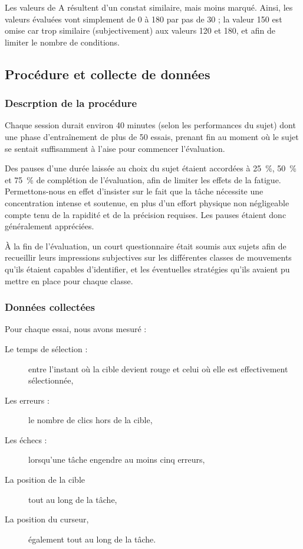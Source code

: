 	Les valeurs de A résultent d'un constat similaire, mais moins marqué. Ainsi, les valeurs évaluées vont simplement de 0\textdegree{} à 180\textdegree{} par pas de 30\textdegree{} ; la valeur 150\textdegree{} est omise car trop similaire (subjectivement) aux valeurs 120\textdegree{} et 180\textdegree{}, et afin de limiter le nombre de conditions.

	\subsection{Procédure et collecte de données}
	\subsubsection{Descrption de la procédure}
	Chaque session durait environ 40 minutes (selon les performances du sujet) dont une phase d'entraînement de plus de 50 essais, prenant fin au moment où le sujet se sentait suffisamment à l'aise pour commencer l'évaluation.
	
	Des pauses d'une durée laissée au choix du sujet étaient accordées à 25~\%{}, 50~\%{} et 75~\%{} de complétion de l'évaluation, afin de limiter les effets de la fatigue. Permettons-nous en effet d'insister sur le fait que la tâche nécessite une concentration intense et soutenue, en plus d'un effort physique non négligeable compte tenu de la rapidité et de la précision requises. Les pauses étaient donc généralement appréciées.
	
	À la fin de l'évaluation, un court questionnaire était soumis aux sujets afin de recueillir leurs impressions subjectives sur les différentes \og classes \fg{} de mouvements qu'ils étaient capables d'identifier, et les éventuelles stratégies qu'ils avaient pu mettre en place pour chaque classe.
	
	\subsubsection{Données collectées}
	Pour chaque essai, nous avons mesuré :
	
	\begin{description}
		\item[Le temps de sélection :] entre l'instant où la cible devient rouge et celui où elle est effectivement sélectionnée,
		\item[Les erreurs :] le nombre de clics hors de la cible,
		\item[Les échecs :] lorsqu'une tâche engendre au moins cinq erreurs,
		\item[La position de la cible] tout au long de la tâche,
		\item[La position du curseur,] également tout au long de la tâche.
	\end{description}

